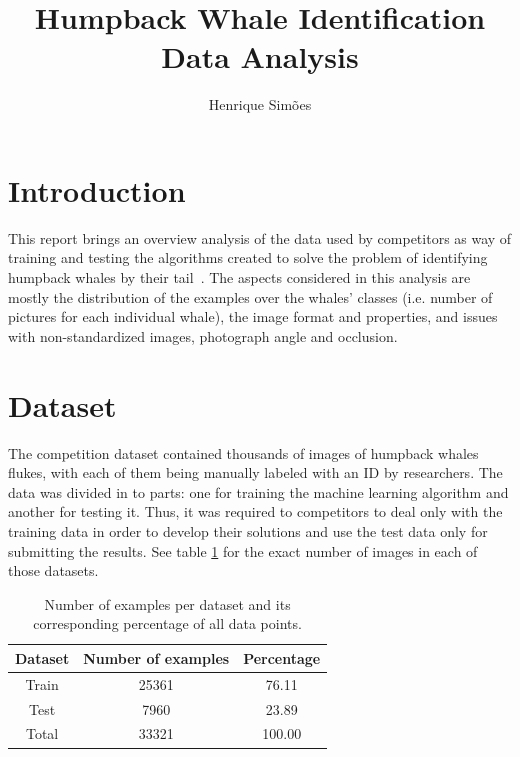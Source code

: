 \documentclass[12pt,
    brazil,			%
	english,        %
	]{article}
\title{Humpback Whale Identification\\Data Analysis}
\author{Henrique Simões}
\begin{document}
\maketitle

\section{Introduction}

This report brings an overview analysis of the data used by competitors as way of training and testing the algorithms created to solve the problem of identifying humpback whales by their tail~\cite{kaggle2019humpback}. The aspects considered in this analysis are mostly the distribution of the examples over the whales' classes (i.e. number of pictures for each individual whale), the image format and properties, and issues with non-standardized images, photograph angle and occlusion.

\section{Dataset}

The competition dataset contained thousands of images of humpback whales flukes, with each of them being manually labeled with an ID by researchers. The data was divided in to parts: one for training the machine learning algorithm and another for testing it. Thus, it was required to competitors to deal only with the training data in order to develop their solutions and use the test data only for submitting the results. See table \ref{tab:number-examples} for the exact number of images in each of those datasets.

\begin{table}[hbt]
    \centering
    \setlength{\tabcolsep}{25pt} %
    \renewcommand{\arraystretch}{1.5} %
    \begin{tabular}{ccc}
        \hline \hline
        Dataset     & Number of examples    & Percentage \\ \hline
        Train       & 25361                 & 76.11 \\
        Test        & 7960                  & 23.89 \\ \hline
        Total       & 33321                 & 100.00 \\
        \hline \hline
    \end{tabular}
    \caption{Number of examples per dataset and its corresponding percentage of all data points.}
    \label{tab:number-examples}
\end{table}
\end{document}
